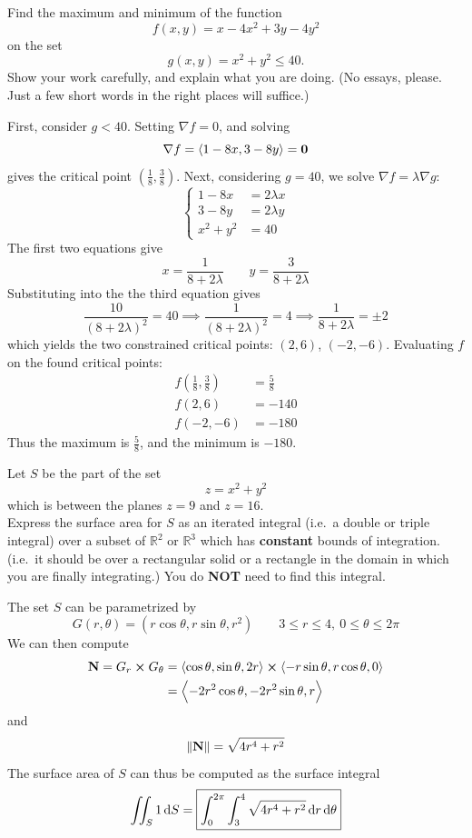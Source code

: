 \documentclass[12pt,answers]{exam}
\newcommand{\vect}[1]{\left\langle #1 \right\rangle}
\newcommand{\RR}{\mathbb{R}}
\begin{document}
\begin{questions}
	\newpage
	\question
	Find the maximum and minimum of the function
	\[
		f(x,y) = x - 4x^2 + 3 y - 4y^2
	\]
	on the set 
	\[
		g(x,y) = x^2 + y^2 \le 40.
	\]
	Show your work carefully, and explain what you are doing. (No essays, please. Just a few short words in the right places will suffice.)
	\begin{solution}
		First, consider $g < 40$. Setting $\nabla f = 0$, and solving
		\[
			\nabla f = \vect{1-8x,3-8y} = \vb 0
		\]
		gives the critical point $(\frac18, \frac38)$.
		Next, considering $g = 40$, we solve $\nabla f = \lambda \nabla g$:
		\[
			\left\{
				\begin{aligned}
					1-8x&=2\lambda x\\
					3-8y&=2\lambda y\\
					x^2 + y^2 &= 40
				\end{aligned}
			\right.
		\]
		The first two equations give
		\[
			x = \frac{1}{8+2\lambda}\qquad y = \frac{3}{8+2\lambda}
		\]
		Substituting into the the third equation gives
		\[
			\frac{10}{(8+2\lambda)^2} = 40
			\implies \frac{1}{(8+2\lambda)^2} = 4
			\implies \frac{1}{8+2\lambda} = \pm 2
		\]
		which yields the two constrained critical points: $(2, 6)$, $(-2, -6)$.
		Evaluating $f$ on the found critical points:
		\begin{align*}
			f(\frac18, \frac38) &= \frac{5}{8} \\ 
			f(2, 6) &= -140 \\ 
			f(-2, -6) &= -180
		\end{align*}
		Thus the maximum is $\frac58$, and the minimum is $-180$.
	\end{solution}

	\newpage
	\question
	Let $S$ be the part of the set 
	\[
		z = x^2 + y^2
	\]
	which is between the planes $z=9$ and $z=16$. \\ 
	Express the surface area for $S$ as an iterated integral (i.e.~a double or triple integral) over a subset of $\RR^2$ or $\RR^3$ which has \textbf{constant} bounds of integration. (i.e.~it should be over a rectangular solid or a rectangle in the domain in which you are finally integrating.) You do \textbf{NOT} need to find this integral.
	\begin{solution}
		The set $S$ can be parametrized by 
		\[
			G(r, \theta) = (r\cos \theta, r\sin\theta, r^2) 
			\qquad 3 \le r \le 4, 
			\ 0 \le \theta \le 2\pi
		\]
		We can then compute
		\begin{align*}
			\vb{N} = G_r \cross G_\theta 
			&= \vect{\cos \theta, \sin\theta, 2r} \cross \vect{-r\sin\theta, r\cos\theta, 0}  \\ 
			&= \vect{-2r^2\cos\theta, -2r^2\sin\theta, r}
		\end{align*}
		and
		\[
			\|\vb{N}\| = \sqrt{4r^4+r^2}
		\]
		The surface area of $S$ can thus be computed as the surface integral
		\[
			\iint_S 1 \dif S  = \boxed{\int_0^{2\pi} \int_3^4 \sqrt{4r^4+r^2} \dif r \dif \theta}
		\]
	\end{solution}


\end{questions}
\end{document}
